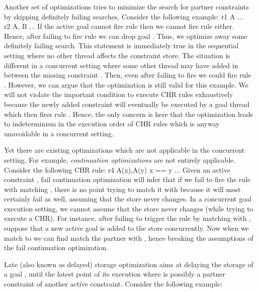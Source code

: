\documentclass{tlp}
\begin{document}
Another set of optimizations tries to minimize the search for partner constraints by skipping 
definitely failing searches. Consider the following example:
 r1 \atsign A \simparrow ... \\
 r2 \atsign A, B \simparrow ...
\eda
If the active goal  cannot fire rule  then we cannot fire rule  either.
Hence, after failing to fire rule  we can drop goal . Thus, we optimize away
some definitely failing search.
This statement is immediately true in the sequential setting where no other thread affects the constraint store.
The situation is different in a concurrent setting
where some other thread may have added in between the missing constraint .
Then, even after failing to fire  we could fire rule .
However, we can argue that the optimization is still valid for this example.
We will not violate the important condition to execute CHR rules exhaustively because
the newly added constraint  will eventually be executed by a goal thread
which then fires rule . 
Hence, the only concern is here that the optimization leads to indeterminism
in the execution order of CHR rules which is anyway unavoidable in a concurrent setting.

Yet there are existing optimizations which are not applicable in the concurrent setting. For example,
{\em continuation optimizations} \cite{greg:thesis,DBLP:conf/iclp/Schrijvers05} are not entirely applicable. 
Consider the following CHR rule:
  r4 \atsign A(x),A(y) \simparrow x == y \mid ...
\eda
Given an active constraint , fail continuation optimization will infer that if we fail to fire the
rule with  matching , there is no point trying to match it with  because it will most
certainly fail as well, assuming that the store never changes. In a concurrent goal execution setting, we
cannot assume that the store never changes (while trying to execute a CHR). For instance, after failing to 
trigger the rule by matching  with , suppose that a new active goal  is added to 
the store concurrently. Now when we match  to  we can find match the partner  with 
, hence breaking the assumptions of the fail continuation optimization.



Late (also known as delayed) storage optimization \cite{greg:thesis} aims at delaying the storage of a goal , until the 
latest point of its execution where  is possibly a partner constraint of another active constraint.
Consider the following example:
\end{document}
